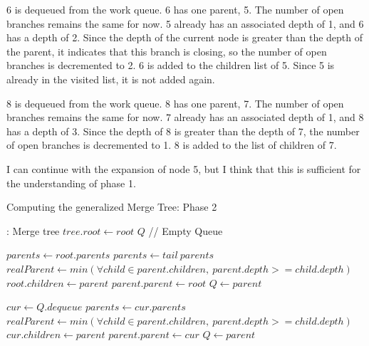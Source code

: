 6 is dequeued from the work queue. 6 has one parent, 5. The number of
open branches remains the same for now. 5 already has an associated
depth of 1, and 6 has a depth of 2. Since the depth of the current node
is greater than the depth of the parent, it indicates that this branch
is closing, so the number of open branches is decremented to 2. 6 is
added to the children list of 5. Since 5 is already in the visited list,
it is not added again.

8 is dequeued from the work queue. 8 has one parent, 7. The number of
open branches remains the same for now. 7 already has an associated
depth of 1, and 8 has a depth of 3. Since the depth of 8 is greater than
the depth of 7, the number of open branches is decremented to 1. 8 is
added to the list of children of 7.

I can continue with the expansion of node 5, but I think that this is
sufficient for the understanding of phase 1.

\begin{algorithm}
  \caption{Computing the generalized Merge Tree: Phase 2}
  \label{alg:generalized_phase_II}
  \begin{algorithmic}[1]
     : Merge tree
    \State $tree.root \gets root$
    \State $Q$ // Empty Queue

    \State $parents \gets root.parents$
    \State $parents \gets tail\ parents$
    \State $realParent \gets min(\forall child \in parent.children,\ parent.depth >= child.depth)$
    \State $root.children \gets parent$
    \State $parent.parent \gets root$
    \State $Q \gets parent$
    \EndIf
    \EndFor

    \State $cur \gets Q.dequeue$
    \State $parents \gets cur.parents$
    \State $realParent \gets min(\forall child \in parent.children,\ parent.depth >= child.depth)$
    \State $cur.children \gets parent$
    \State $parent.parent \gets cur$
    \State $Q \gets parent$
    \EndIf

    \EndFor
    \EndWhile

    \EndFunction
  \end{algorithmic}
\end{algorithm}

